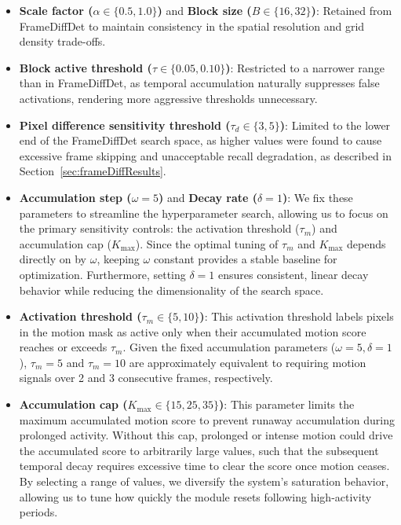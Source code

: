 \documentclass[
  10pt,
]{article}
\begin{document}
\begin{itemize}
\item
  \textbf{Scale factor (\(\alpha \in \{0.5, 1.0\}\))} and \textbf{Block
  size (\(B \in \{16,
  32\}\))}: Retained from FrameDiffDet to maintain consistency in the
  spatial resolution and grid density trade-offs.
\item
  \textbf{Block active threshold (\(\tau \in \{0.05, 0.10\}\))}:
  Restricted to a narrower range than in FrameDiffDet, as temporal
  accumulation naturally suppresses false activations, rendering more
  aggressive thresholds unnecessary.
\item
  \textbf{Pixel difference sensitivity threshold
  (\(\tau_d \in \{3, 5\}\))}: Limited to the lower end of the
  FrameDiffDet search space, as higher values were found to cause
  excessive frame skipping and unacceptable recall degradation, as
  described in Section~\ref{sec:frameDiffResults}.
\item
  \textbf{Accumulation step (\(\omega=5\))} and \textbf{Decay rate
  (\(\delta=1\))}: We fix these parameters to streamline the
  hyperparameter search, allowing us to focus on the primary sensitivity
  controls: the activation threshold (\(\tau_m\)) and accumulation cap
  (\(K_{\max}\)). Since the optimal tuning of \(\tau_m\) and
  \(K_{\max}\) depends directly on by \(\omega\), keeping \(\omega\)
  constant provides a stable baseline for optimization. Furthermore,
  setting \(\delta=1\) ensures consistent, linear decay behavior while
  reducing the dimensionality of the search space.
\item
  \textbf{Activation threshold (\(\tau_m \in \{5, 10\}\))}: This
  activation threshold labels pixels in the motion mask as active only
  when their accumulated motion score reaches or exceeds \(\tau_m\).
  Given the fixed accumulation parameters (\(\omega=5, \delta=1\)),
  \(\tau_m=5\) and \(\tau_m=10\) are approximately equivalent to
  requiring motion signals over 2 and 3 consecutive frames,
  respectively.
\item
  \textbf{Accumulation cap (\(K_{\max} \in \{15, 25, 35\}\))}: This
  parameter limits the maximum accumulated motion score to prevent
  runaway accumulation during prolonged activity. Without this cap,
  prolonged or intense motion could drive the accumulated score to
  arbitrarily large values, such that the subsequent temporal decay
  requires excessive time to clear the score once motion ceases. By
  selecting a range of values, we diversify the system's saturation
  behavior, allowing us to tune how quickly the module resets following
  high-activity periods.
\end{itemize}
\end{document}
